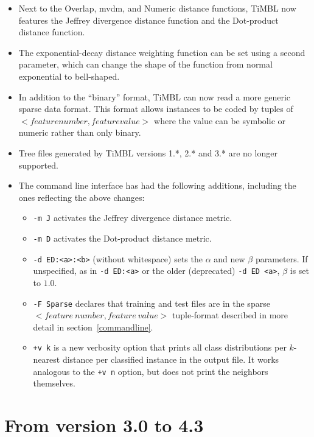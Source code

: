 \documentclass{report}
\begin{document}
\begin{itemize}

\item Next to the Overlap, {\sc mvdm}, and Numeric distance functions,
  TiMBL now features the Jeffrey divergence distance function and the
  Dot-product distance function.

\item The exponential-decay distance weighting function can be set
  using a second parameter, which can change the shape of the function
  from normal exponential to bell-shaped.

\item In addition to the ``binary'' format, TiMBL can now read
  a more generic sparse data format. This format allows instances to
  be coded by tuples of $< feature number, feature value >$ where the
  value can be symbolic or numeric rather than only binary.

\item Tree files generated by TiMBL versions 1.*, 2.* and 3.* are no
longer supported.

\item The command line interface has had the following additions, including the ones reflecting the above changes:

\begin{itemize} 
\item {\tt -m J} activates the Jeffrey divergence distance metric.
\item {\tt -m D} activates the Dot-product distance metric.
\item {\tt -d ED:<a>:<b>} (without whitespace) sets the $\alpha$ and new
  $\beta$ parameters. If unspecified, as in {\tt -d ED:<a>} or the older
  (deprecated) {\tt -d ED <a>}, $\beta$ is set to $1.0$.
\item {\tt -F Sparse} declares that training and test files are in the
  sparse $< feature\ number, feature\ value >$ tuple-format described in
  more detail in section~\ref{commandline}.
\item {\tt +v k} is a new verbosity option that prints all class
distributions per $k$-nearest distance per classified instance in the
output file. It works analogous to the {\tt +v n} option, but does not
print the neighbors themselves.
\end{itemize}

\end{itemize}

\section{From version 3.0 to 4.3}
\end{document}
